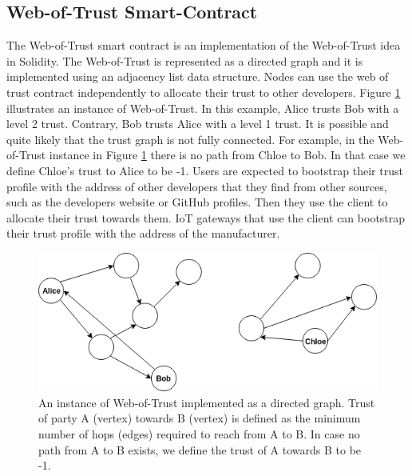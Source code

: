 {{\subsection{Web-of-Trust Smart-Contract}{
The Web-of-Trust smart contract is an implementation of the Web-of-Trust idea in Solidity. The Web-of-Trust is represented as a directed graph and it is implemented using an adjacency list data structure. Nodes can use the web of trust contract independently to allocate their trust to other developers. Figure \ref{fig:webT} illustrates an instance of Web-of-Trust. In this example, Alice trusts Bob with a level 2 trust. Contrary, Bob trusts Alice with a level 1 trust. It is possible and quite likely that the trust graph is not fully connected. For example, in the Web-of-Trust instance in Figure \ref{fig:webT} there is no path from Chloe to Bob. In that case we define Chloe's trust to Alice to be -1. Users are expected to bootstrap their trust profile with the address of other developers that they find from other sources, such as the developers website or GitHub profiles. Then they use the client to allocate their trust towards them. IoT gateways that use the client can bootstrap their trust profile with the address of the manufacturer.

\begin{figure}[!htb]
\centering
\includegraphics[width=\textwidth]{web_of_trust.png}
\caption{An instance of Web-of-Trust implemented as a directed graph. Trust of party A (vertex) towards B (vertex) is defined as the minimum number of hops (edges) required to reach from A to B. In case no path from A to B exists, we define the trust of A towards B to be -1. }
\label{fig:webT}
\end{figure}

}}}
